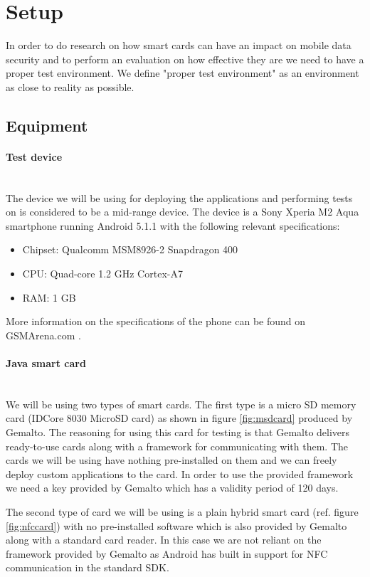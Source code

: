 \section{Setup}
In order to do research on how smart cards can have an impact on mobile data security and to perform an evaluation on how effective they are we need to have a proper test environment. We define "proper test environment" as an environment as close to reality as possible.
\subsection{Equipment}
\label{sec:equipment}

\paragraph{Test device}\mbox{}\\
The device we will be using for deploying the applications and performing tests on is considered to be a mid-range device. The device is a Sony Xperia M2 Aqua smartphone running Android 5.1.1 with the following relevant specifications:
\begin{itemize}
    \item Chipset: Qualcomm MSM8926-2 Snapdragon 400
    \item CPU: Quad-core 1.2 GHz Cortex-A7
    \item RAM: 1 GB
\end{itemize}
More information on the specifications of the phone can be found on  \newline
GSMArena.com \cite{sonym2}.

\paragraph{Java smart card}\mbox{}\\
We will be using two types of smart cards. The first type is a micro SD memory card (IDCore 8030 MicroSD card) as shown in figure \ref{fig:msdcard} produced by Gemalto. The reasoning for using this card for testing is that Gemalto delivers ready-to-use cards along with a framework for communicating with them. The cards we will be using have nothing pre-installed on them and we can freely deploy custom applications to the card. In order to use the provided framework we need a key provided by Gemalto which has a validity period of 120 days.

The second type of card we will be using is a plain hybrid smart card (ref. figure \ref{fig:nfccard}) with no pre-installed software which is also provided by Gemalto along with a standard card reader. In this case we are not reliant on the framework provided by Gemalto as Android has built in support for NFC communication in the standard SDK.

